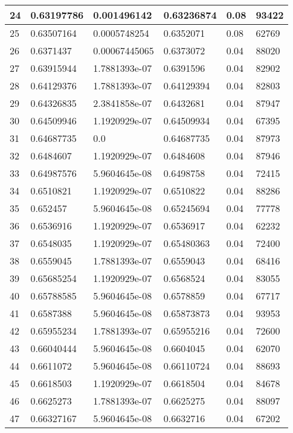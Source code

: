 \begin{longtable}{|l|l|l|l|l|l|}
24 & 0.63197786 & 0.001496142 & 0.63236874 & 0.08 & 93422 \\ \hline 
25 & 0.63507164 & 0.0005748254 & 0.6352071 & 0.08 & 62769 \\ \hline 
26 & 0.6371437 & 0.00067445065 & 0.6373072 & 0.04 & 88020 \\ \hline 
27 & 0.63915944 & 1.7881393e-07 & 0.6391596 & 0.04 & 82902 \\ \hline 
28 & 0.64129376 & 1.7881393e-07 & 0.64129394 & 0.04 & 82803 \\ \hline 
29 & 0.64326835 & 2.3841858e-07 & 0.6432681 & 0.04 & 87947 \\ \hline 
30 & 0.64509946 & 1.1920929e-07 & 0.64509934 & 0.04 & 67395 \\ \hline 
31 & 0.64687735 & 0.0 & 0.64687735 & 0.04 & 87973 \\ \hline 
32 & 0.6484607 & 1.1920929e-07 & 0.6484608 & 0.04 & 87946 \\ \hline 
33 & 0.64987576 & 5.9604645e-08 & 0.6498758 & 0.04 & 72415 \\ \hline 
34 & 0.6510821 & 1.1920929e-07 & 0.6510822 & 0.04 & 88286 \\ \hline 
35 & 0.652457 & 5.9604645e-08 & 0.65245694 & 0.04 & 77778 \\ \hline 
36 & 0.6536916 & 1.1920929e-07 & 0.6536917 & 0.04 & 62232 \\ \hline 
37 & 0.6548035 & 1.1920929e-07 & 0.65480363 & 0.04 & 72400 \\ \hline 
38 & 0.6559045 & 1.7881393e-07 & 0.6559043 & 0.04 & 68416 \\ \hline 
39 & 0.65685254 & 1.1920929e-07 & 0.6568524 & 0.04 & 83055 \\ \hline 
40 & 0.65788585 & 5.9604645e-08 & 0.6578859 & 0.04 & 67717 \\ \hline 
41 & 0.6587388 & 5.9604645e-08 & 0.65873873 & 0.04 & 93953 \\ \hline 
42 & 0.65955234 & 1.7881393e-07 & 0.65955216 & 0.04 & 72600 \\ \hline 
43 & 0.66040444 & 5.9604645e-08 & 0.6604045 & 0.04 & 62070 \\ \hline 
44 & 0.6611072 & 5.9604645e-08 & 0.66110724 & 0.04 & 88693 \\ \hline 
45 & 0.6618503 & 1.1920929e-07 & 0.6618504 & 0.04 & 84678 \\ \hline 
46 & 0.6625273 & 1.7881393e-07 & 0.6625275 & 0.04 & 88097 \\ \hline 
47 & 0.66327167 & 5.9604645e-08 & 0.6632716 & 0.04 & 67202 \\ \hline 

\end{longtable}
